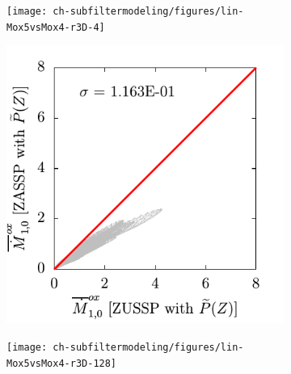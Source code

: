 \begin{figure}[ht]
  \centering
  \begin{subfigure}[b]{0.33\linewidth}
    \centering
    \texttt{[image: ch-subfiltermodeling/figures/lin-Mox5vsMox4-r3D-4]}
  \end{subfigure}%
  \begin{subfigure}[b]{0.33\linewidth}
    \centering
    \includegraphics[width=\linewidth]{ch-subfiltermodeling/figures/lin-Mox5vsMox4-r3D-32}
  \end{subfigure}%
  \begin{subfigure}[b]{0.33\linewidth}
    \centering
    \texttt{[image: ch-subfiltermodeling/figures/lin-Mox5vsMox4-r3D-128]}
  \end{subfigure}

\end{figure}

